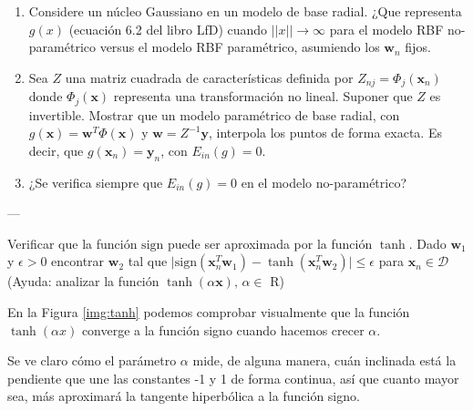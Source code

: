 \documentclass[a4paper, 11pt]{article}
\begin{document}
\begin{solucion}
      \begin{ejercicio}
          \begin{enumerate}
          \item Considere un núcleo Gaussiano en un modelo de base radial. ¿Que representa $g(x)$ (ecuación 6.2 del libro LfD) cuando $||x||\rightarrow \infty$ para el modelo RBF no-paramétrico versus el modelo RBF paramétrico, asumiendo los $\textbf{w}_n$ fijos.
          \item Sea $Z$ una matriz cuadrada de características definida por $Z_{nj}=\Phi_j(\textbf{x}_n)$ donde $\Phi_j(\textbf{x})$ representa una transformación no lineal. Suponer que $Z$ es invertible. Mostrar que  un modelo paramétrico de base radial, con $g(\textbf{x})=\textbf{w}^T\Phi(\textbf{x})$ y $\textbf{w}=Z^{-1}\textbf{y}$, interpola los puntos de forma exacta. Es decir, que $g(\textbf{x}_n)=\textbf{y}_n$, con $E_{in}(g)=0$.
          \item ¿Se verifica siempre que $E_{in}(g)=0$ en el modelo no-paramétrico?
          \end{enumerate}
      \end{ejercicio}

      \begin{solucion}
        ---
      \end{solucion}

      \begin{ejercicio}
        Verificar que la función $\mathrm{sign}$ puede ser aproximada por la función $\tanh$. Dado $\textbf{w}_1$ y $\epsilon>0$ encontrar $\textbf{w}_2$ tal que $\vert\mathrm{sign}(\textbf{x}_n^T \textbf{w}_1) - \tanh(\textbf{x}_n^T\textbf{w}_2)\vert \leq \epsilon$ para $\textbf{x}_n\in \mathcal{D}$ (Ayuda: analizar la función $\tanh(\alpha\textbf{x}),\, \alpha\in$ R)
      \end{ejercicio}

      \begin{solucion}
          En la Figura \ref{img:tanh} podemos comprobar visualmente que la función $\operatorname{tanh}(\alpha x)$ converge a la función signo cuando hacemos crecer $\alpha$.

          Se ve claro cómo el parámetro $\alpha$ mide, de alguna manera, cuán inclinada está la pendiente que une las constantes -1 y 1 de forma continua, así que cuanto mayor sea, más aproximará la tangente hiperbólica a la función signo.


\end{solucion}
\end{solucion}
\end{document}
